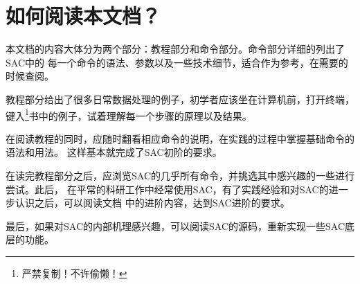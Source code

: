 \section{如何阅读本文档？}

本文档的内容大体分为两个部分：教程部分和命令部分。命令部分详细的列出了SAC中的
每一个命令的语法、参数以及一些技术细节，适合作为参考，在需要的时候查阅。

教程部分给出了很多日常数据处理的例子，初学者应该坐在计算机前，打开终端，
键入\footnote{严禁复制！不许偷懒！}书中的例子，试着理解每一个步骤的原理以及结果。

在阅读教程的同时，应随时翻看相应命令的说明，在实践的过程中掌握基础命令的语法和用法。
这样基本就完成了SAC初阶的要求。

在读完教程部分之后，应浏览SAC的几乎所有命令，并挑选其中感兴趣的一些进行尝试。此后，
在平常的科研工作中经常使用SAC，有了实践经验和对SAC的进一步认识之后，可以阅读文档
中的进阶内容，达到SAC进阶的要求。

最后，如果对SAC的内部机理感兴趣，可以阅读SAC的源码，重新实现一些SAC底层的功能。
